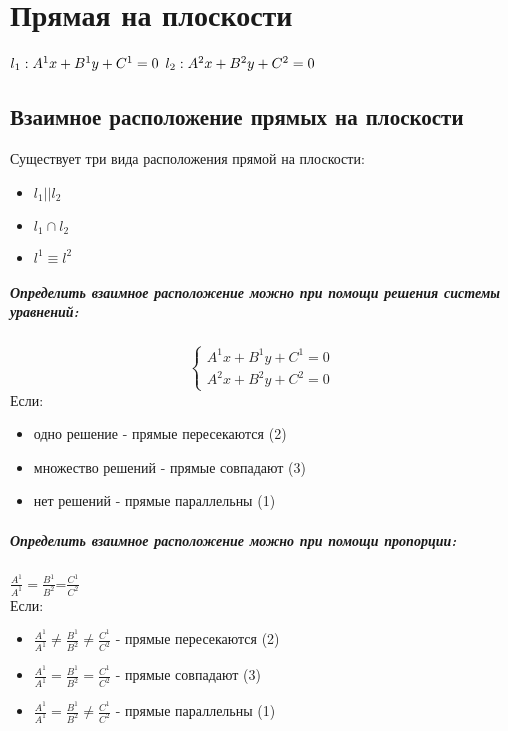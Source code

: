 \documentclass{book}
\begin{document}
\chapter{Прямая на плоскости}
$l_1: A^1x+B^1y+C^1=0\\$
$l_2: A^2x+B^2y+C^2=0\\$
\section{Взаимное расположение прямых на плоскости}
Существует три вида расположения прямой на плоскости:
\begin{itemize}
    \item $l_1||l_2$
    \item $l_1 \cap l_2$
    \item $l^1 \equiv l^2$
\end{itemize}
\paragraph*{Определить взаимное расположение можно при помощи решения системы уравнений:}
\begin{equation}
    \begin{cases}
        A^1x+B^1y+C^1=0\\
        A^2x+B^2y+C^2=0
    \end{cases}
\end{equation}
Если:
\begin{itemize}
    \item одно решение - прямые пересекаются (2)
    \item множество решений - прямые совпадают (3)
    \item нет решений - прямые параллельны (1)
\end{itemize}
\paragraph*{Определить взаимное расположение можно при помощи пропорции:}
$\frac{A^1}{A^1}=\frac{B^1}{B^2}$=$\frac{C^1}{C^2}$\\
Если:
\begin{itemize}
    \item $\frac{A^1}{A^1} \neq \frac{B^1}{B^2} \neq \frac{C^1}{C^2}$ - прямые пересекаются (2)
    \item $\frac{A^1}{A^1} = \frac{B^1}{B^2} = \frac{C^1}{C^2}$ - прямые совпадают (3)
    \item $\frac{A^1}{A^1} = \frac{B^1}{B^2} \neq \frac{C^1}{C^2}$ - прямые параллельны (1)
\end{itemize}
\end{document}
